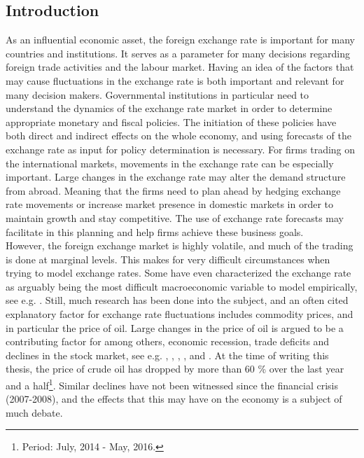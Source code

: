 \documentclass[10pt]{article}
\newcommand\blankpage{%
    \null
    \thispagestyle{empty}%
    \addtocounter{page}{-1}%
    \newpage}
\numberwithin{equation}{section}
\numberwithin{table}{section}
\numberwithin{figure}{section}
\begin{document}
\begin{spacing}{1.5}
\newpage
\afterpage{\blankpage}
\newpage
\tableofcontents

\newpage
{}
\section{Introduction}
\label{sec:intro}

\noindent As an influential economic asset, the foreign exchange rate is important for many countries and institutions. It serves as a parameter for many decisions regarding foreign trade activities and the labour market. Having an idea of the factors that may cause fluctuations in the exchange rate is both important and relevant for many decision makers. Governmental institutions in particular need to understand the dynamics of the exchange rate market in order to determine appropriate monetary and fiscal policies. The initiation of these policies have both direct and indirect effects on the whole economy, and using forecasts of the exchange rate as input for policy determination is necessary. For firms trading on the international markets, movements in the exchange rate can be especially important. Large changes in the exchange rate may alter the demand structure from abroad. Meaning that the firms need to plan ahead by hedging exchange rate movements or increase market presence in domestic markets in order to maintain growth and stay competitive. The use of exchange rate forecasts may facilitate in this planning and help firms achieve these business goals. \\
\indent However, the foreign exchange market is highly volatile, and much of the trading is done at marginal levels. This makes for very difficult circumstances when trying to model exchange rates. Some have even characterized the exchange rate as arguably being the most difficult macroeconomic variable to model empirically, see e.g. \cite{amano1998exchange}. Still, much research has been done into the subject, and an often cited explanatory factor for exchange rate fluctuations includes commodity prices, and in particular the price of oil. Large changes in the price of oil is argued to be a contributing factor for among others, economic recession, trade deficits and declines in the stock market, see e.g. \cite{hamilton1983oil, hamilton2005oil}, \cite{mork1989oil}, \cite{sadorsky1999oil}, \cite{backus2000oil}, \cite{barsky2004oil} and \cite{kilian2009impact}. At the time of writing this thesis, the price of crude oil has dropped by more than 60 \% over the last year and a half\footnote{Period: July, 2014 - May, 2016.}. Similar declines have not been witnessed since the financial crisis (2007-2008), and the effects that this may have on the economy is a subject of much debate.\\

\end{spacing}
\end{document}
